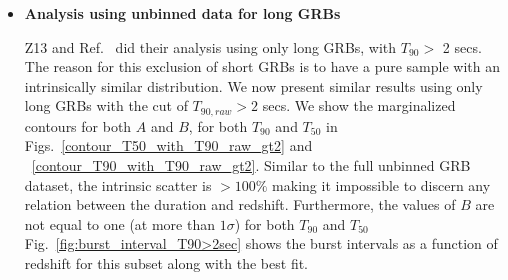 \documentclass[prd,nofootinbib,preprintnumbers,floatfix]{revtex4}  %
\begin{document}
\begin{itemize}


    






\item {\bf Analysis  using unbinned data for long GRBs} 

\label{sec:analysis_T90_raw_gt_2s}
Z13 and Ref.~\cite{Butler} did their analysis
using only long GRBs, with $T_{90} >$ 2 secs. The reason for this exclusion of short GRBs is to have a pure sample with an intrinsically similar distribution. We now present similar  results using only long  GRBs  with the cut of $T_{90,raw} > 2$ secs. We show the marginalized contours for both $A$ and $B$, for both $T_{90}$
and $T_{50}$ in Figs.~\ref{contour_T50_with_T90_raw_gt2} and ~\ref{contour_T90_with_T90_raw_gt2}. Similar to the full unbinned GRB dataset, the intrinsic scatter is $> 100\%$ making it impossible to discern any relation between the duration and redshift. Furthermore, the values of $B$ are not equal to one (at more than $1\sigma$) for both $T_{90}$
and $T_{50}$ Fig.~\ref{fig:burst_interval_T90>2sec} shows the  burst intervals as a function of  redshift for this subset along with the best fit.


\end{itemize}
\end{document}
